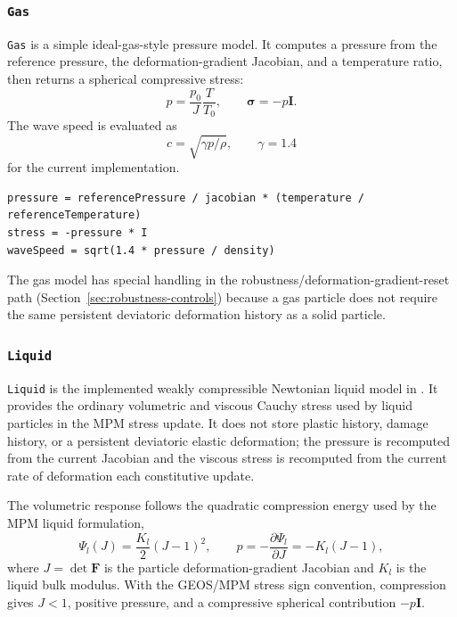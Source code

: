 \subsubsection{\texttt{Gas}}
\label{subsubsec:gas-model}

\texttt{Gas} is a simple ideal-gas-style pressure model.  It computes a pressure from the reference pressure, the deformation-gradient Jacobian, and a temperature ratio, then returns a spherical compressive stress:
\begin{equation}
  p = \frac{p_0}{J}\frac{T}{T_0},
  \qquad
  \boldsymbol{\sigma}=-p\mathbf{I}.
  \label{eq:gas-pressure}
\end{equation}
The wave speed is evaluated as
\begin{equation}
  c = \sqrt{\gamma p/\rho},
  \qquad \gamma=1.4
  \label{eq:gas-wavespeed}
\end{equation}
for the current implementation.

\begin{lstlisting}[caption={Gas stress update.},label={alg:gas-update},basicstyle=\ttfamily\small]
pressure = referencePressure / jacobian * (temperature / referenceTemperature)
stress = -pressure * I
waveSpeed = sqrt(1.4 * pressure / density)
\end{lstlisting}

The gas model has special handling in the robustness/deformation-gradient-reset path (Section~\ref{sec:robustness-controls}) because a gas particle does not require the same persistent deviatoric deformation history as a solid particle.

\subsubsection{\texttt{Liquid}}
\label{subsubsec:liquid-model}

\texttt{Liquid} is the implemented weakly compressible Newtonian liquid model in .  It provides the ordinary volumetric and viscous Cauchy stress used by liquid particles in the MPM stress update.  It does not store plastic history, damage history, or a persistent deviatoric elastic deformation; the pressure is recomputed from the current Jacobian and the viscous stress is recomputed from the current rate of deformation each constitutive update.

The volumetric response follows the quadratic compression energy used by the MPM liquid formulation,
\begin{equation}
  \Psi_l(J)=\frac{K_l}{2}\left(J-1\right)^2,
  \qquad
  p=-\frac{\partial \Psi_l}{\partial J}=-K_l\left(J-1\right),
  \label{eq:liquid-pressure-from-energy}
\end{equation}
where \(J=\det\mathbf{F}\) is the particle deformation-gradient Jacobian and \(K_l\) is the liquid bulk modulus.  With the GEOS/MPM stress sign convention, compression gives \(J<1\), positive pressure, and a compressive spherical contribution \(-p\mathbf{I}\).

